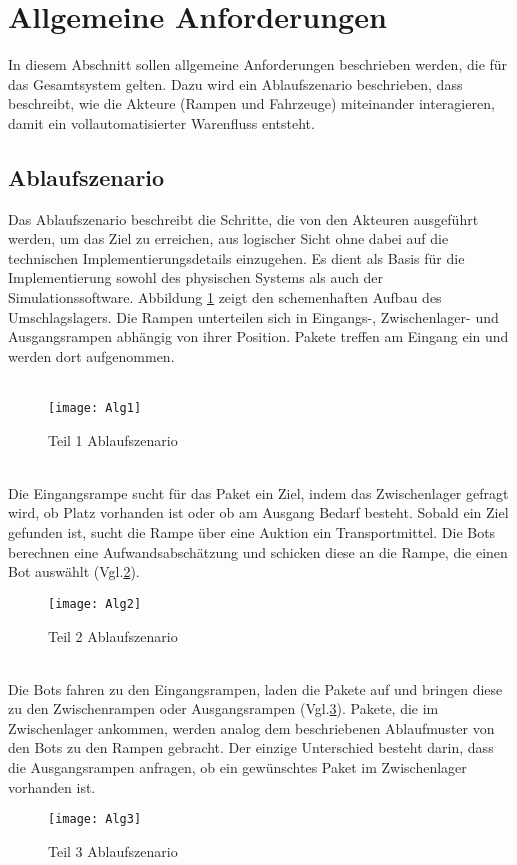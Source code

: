 \section{Allgemeine Anforderungen}
In diesem Abschnitt sollen allgemeine Anforderungen beschrieben werden, die für das Gesamtsystem gelten. Dazu wird ein Ablaufszenario beschrieben, dass beschreibt, wie die Akteure (Rampen und Fahrzeuge) miteinander interagieren, damit ein vollautomatisierter Warenfluss entsteht.
\subsection{Ablaufszenario}\label{AL} 
Das Ablaufszenario beschreibt die Schritte, die von den Akteuren ausgeführt werden, um das Ziel zu erreichen, aus logischer Sicht ohne dabei auf die technischen Implementierungsdetails einzugehen. Es dient als Basis für die Implementierung sowohl des physischen Systems als auch der Simulationssoftware. Abbildung \ref{Abl1} zeigt den schemenhaften Aufbau des Umschlagslagers. Die Rampen unterteilen sich in Eingangs-, Zwischenlager- und Ausgangsrampen abhängig von ihrer Position. Pakete treffen am Eingang ein und werden dort aufgenommen. 
\\\\
\begin{figure}[h!]
	\centering
		\texttt{[image: Alg1]}        
		\caption{Teil 1 Ablaufszenario}
	\label{Abl1}
\end{figure}
\\
Die Eingangsrampe sucht für das Paket ein Ziel, indem das Zwischenlager gefragt wird, ob Platz vorhanden ist oder ob am Ausgang Bedarf besteht. Sobald ein Ziel gefunden ist, sucht die Rampe über eine Auktion ein Transportmittel. Die Bots berechnen eine Aufwandsabschätzung und schicken diese an die Rampe, die einen Bot auswählt (Vgl.\ref{Abl2}). 
\\   
\begin{figure}[h!]
	\centering
		\texttt{[image: Alg2]}        
		\caption{Teil 2 Ablaufszenario}
	\label{Abl2}
\end{figure} 
\\
Die Bots fahren zu den Eingangsrampen, laden die Pakete auf und bringen diese zu den Zwischenrampen oder Ausgangsrampen (Vgl.\ref{Abl3}). Pakete, die im Zwischenlager ankommen, werden analog dem beschriebenen Ablaufmuster von den Bots zu den Rampen gebracht. Der einzige Unterschied besteht darin, dass die Ausgangsrampen anfragen, ob ein gewünschtes Paket im Zwischenlager vorhanden ist.
\begin{figure}[h!]
	\centering
		\texttt{[image: Alg3]}        
		\caption{Teil 3 Ablaufszenario}
	\label{Abl3}
\end{figure}  
